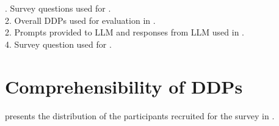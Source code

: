 . Survey questions used for .\\
2.  Overall DDPs used for evaluation in .\\
2. Prompts provided to LLM and responses from LLM used in .\\
4. Survey question used for .\\


\label{appendix:comprehensible}

\section{Comprehensibility of DDPs}
\label{appendix:comprehensible}
 presents the distribution of the participants recruited for the survey in .

